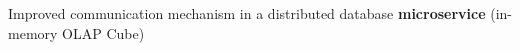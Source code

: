\begin{cventries}
{\begin{cvitems}
        \item{Improved communication mechanism in a distributed database \textbf{microservice} (in-memory OLAP Cube)}
%
      \end{cvitems}
    }



\end{cventries}
